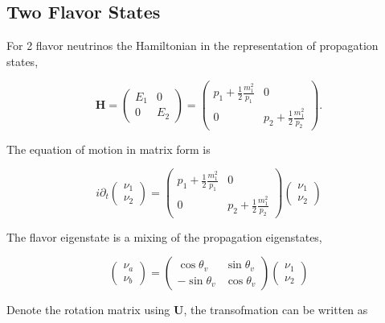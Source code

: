 \documentclass{tufte-handout}
\begin{document}
\subsection{Two Flavor States}


For 2 flavor neutrinos the Hamiltonian in the representation of propagation states,

\begin{equation*}
\mathbf H  = \begin{pmatrix}
E_1 & 0 \\
0 & E_2
\end{pmatrix} 
 = \begin{pmatrix}
p_1 + \frac{1}{2}\frac{m_1^2}{p_1} & 0 \\
0 & p_2 + \frac{1}{2}\frac{m_1^2}{p_2}
\end{pmatrix}.
\end{equation*}

The equation of motion in matrix form is

\begin{equation}
i\partial_t \begin{pmatrix}
\nu_1 \\ \nu_2 \end{pmatrix} = \begin{pmatrix}
p_1 + \frac{1}{2}\frac{m_1^2}{p_1} & 0 \\
0 & p_2 + \frac{1}{2}\frac{m_1^2}{p_2}
\end{pmatrix} \begin{pmatrix}
\nu_1 \\ \nu_2 \end{pmatrix} 
\end{equation}

The flavor eigenstate is a mixing of the propagation eigenstates,

\begin{equation}
\begin{pmatrix}
\nu_a \\ \nu_b \end{pmatrix} = 
\begin{pmatrix} \cos\theta_v & \sin\theta_v \\ -\sin\theta_v  & \cos\theta_v
\end{pmatrix} \begin{pmatrix}  \nu_1 \\ \nu_2
\end{pmatrix}
\end{equation}


Denote the rotation matrix using $\mathbf U$, the transofmation can be written as
\end{document}
